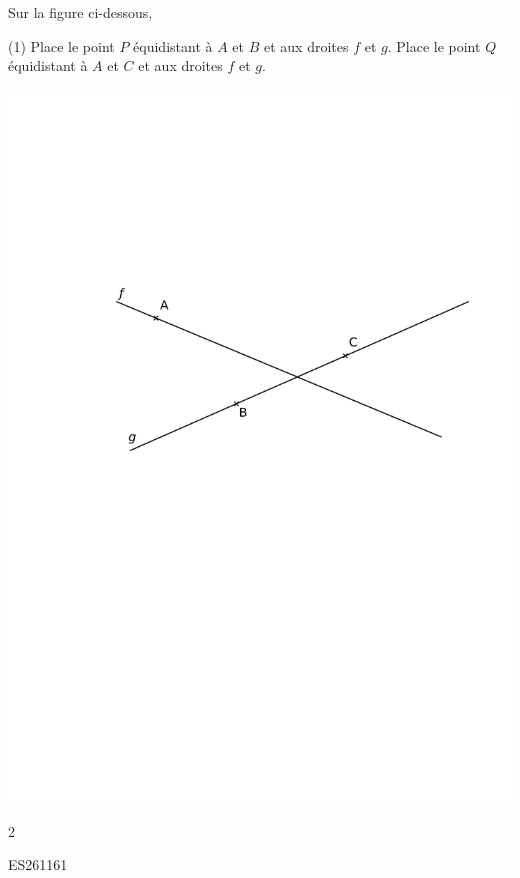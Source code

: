 \documentclass[a4paper,11pt]{report}
\begin{document}
\begin{exop}
{Sur la figure ci-dessous, 
\begin{tasks}(1)
	\task Place le point $P$ équidistant à $A$ et $B$ et aux droites $f$ et $g$.
	\task Place le point $Q$ équidistant à $A$ et $C$ et aux droites $f$ et $g$.
\end{tasks}

\begin{center}
	\includegraphics[scale=1]{media/es-10/12-12}
\end{center}
%
}
{2}
\end{exop}
\begin{exof}{ES26}{116}{1}
\end{exof}
\end{document}

